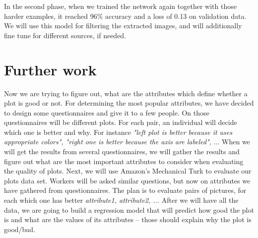 \documentclass[fleqn,moreauthors,10pt]{ds_report}
\begin{document}
	In the second phase, when we trained the network again together with those harder examples, it reached 96\% accuracy and a loss of 0.13 on validation data. We will use this model for filtering the extracted images, and will additionally fine tune for different sources, if needed.
	
	\section*{Further work}
	Now we are trying to figure out, what are the attributes which define whether a plot is good or not. For determining the most popular attributes, we have decided to design some questionnaires and give it to a few people. On those questionnaires will be different plots. For each pair, an individual will decide which one is better and why. For instance \emph{"left plot is better because it uses appropriate colors", "right one is better because the axis are labeled",} ... When we will get the results from several questionnaires, we will gather the results and figure out what are the most important attributes to consider when evaluating the quality of plots. Next, we will use Amazon's Mechanical Turk to evaluate our plots data set. Workers will be asked similar questions, but now on attributes we have gathered from questionnaires. The plan is to evaluate pairs of pictures, for each which one has better \emph{attribute1, attribute2, ...} After we will have all the data, we are going to build a regression model that will predict how good the plot is and what are the values of its attributes -- those should explain why the plot is good/bad.
	
	
	
	
	
	
	
	
	
	
	
	
	
\end{document}
